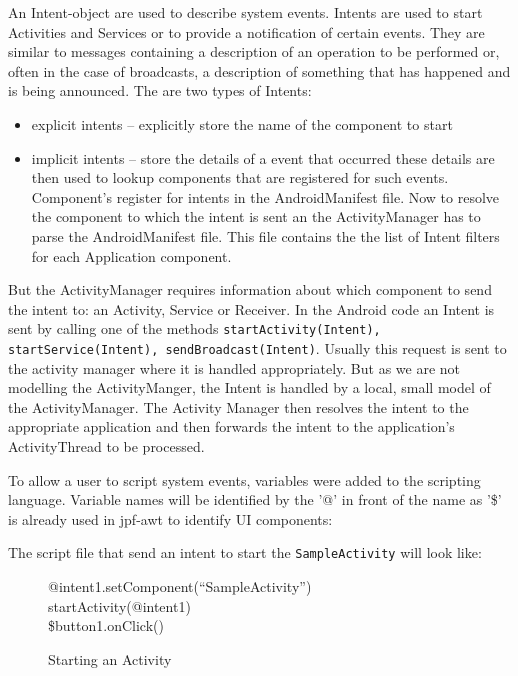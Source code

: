 \documentclass{sig-alternate}
\begin{document}
An Intent-object are used to describe system events. Intents are used to start Activities
and Services or to provide a notification of certain events. They are similar to messages containing a description of an operation to be
performed or, often in the case of broadcasts, a description of something that has happened and is being announced. The are two types of
Intents:
\begin{itemize}
 \item explicit intents -- explicitly store the name of the component to start
 \item implicit intents -- store the details of a event that occurred these details are then used to lookup components that are registered
for such events. Component's register for intents in the AndroidManifest file. Now to resolve the component to which the intent is sent an
the ActivityManager has to parse the AndroidManifest file. This file contains the the list of Intent filters for each
Application component. 
\end{itemize}

But the ActivityManager requires information about which component to send the intent to: an Activity, Service or Receiver. In the Android
code
an Intent is sent by calling one of the methods \texttt{startActivity(Intent), startService(Intent), sendBroadcast(Intent)}. Usually this
request is sent to the activity manager where it is handled appropriately. But as we are not modelling the
ActivityManger, the Intent is handled by a local, small model of the ActivityManager. The Activity Manager then resolves the intent to the
appropriate application and then forwards the intent to the application's ActivityThread to be processed.

To allow a user to script system events, variables were added to the scripting language. Variable names will be identified by
the '@' in front of the name as '\$' is already used in jpf-awt to identify UI components:

The script file that send an intent to start the \texttt{SampleActivity} will look like:
\begin{figure}
{\small
{\sf 
@intent1.setComponent(``SampleActivity'')\\
startActivity(@intent1)\\
\$button1.onClick()
}
}
\caption{Starting an Activity}
\end{figure}
\end{document}
